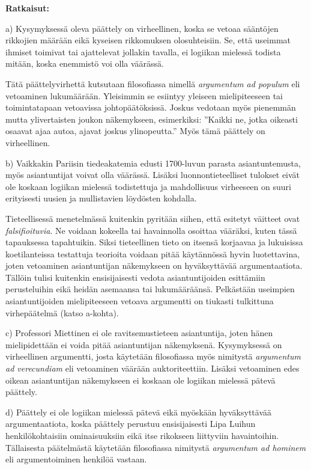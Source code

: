 {\bf Ratkaisut:}

a) Kysymyksessä oleva päättely on virheellinen, koska se vetoaa sääntöjen rikkojien määrään eikä kyseisen rikkomuksen olosuhteisiin. Se, että useimmat ihmiset toimivat tai ajattelevat jollakin tavalla, ei logiikan mielessä todista mitään, koska enemmistö voi olla väärässä.

Tätä päättelyvirhettä kutsutaan filosofiassa nimellä {\em argumentum ad populum} eli vetoaminen lukumäärään.  Yleisimmin se esiintyy yleiseen mielipiteeseen tai toimintatapaan vetoavissa johtopäätöksissä. Joskus vedotaan myös pienemmän mutta ylivertaisten joukon näkemykseen, esimerkiksi: ''Kaikki ne, jotka oikeasti osaavat ajaa autoa, ajavat joskus ylinopeutta.'' Myös tämä päättely on virheellinen.

b) Vaikkakin Pariisin tiedeakatemia edusti 1700-luvun parasta asiantuntemusta, myös asiantuntijat voivat olla väärässä. Lisäksi luonnontieteelliset tulokset eivät ole koskaan logiikan mielessä todistettuja ja mahdollisuus virheeseen on suuri erityisesti uusien ja mullistavien löy\-dös\-ten kohdalla.

Tieteellisessä menetelmässä kuitenkin pyritään siihen, että esitetyt väitteet ovat {\em falsifioituvia}. Ne voidaan kokeella tai havainnolla osoittaa vääräksi, kuten tässä tapauksessa tapahtuikin. Siksi tieteellinen tieto on itsensä korjaavaa ja lukuisissa koetilanteissa testattuja teorioita voidaan pitää käytännössä hyvin luotettavina, joten vetoaminen asiantuntijan näkemykseen on hyväksyttävää argumentaatiota. Tällöin tulisi kuitenkin ensisijaisesti vedota asiantuntijoiden esittämiin perusteluihin eikä heidän asemaansa tai lukumääräänsä. Pelkästään useimpien asiantuntijoiden mielipiteeseen vetoava argumentti on tiukasti tulkittuna virhepäätelmä (katso a-kohta).

c) Professori Miettinen ei ole ravitsemustieteen asiantuntija, joten hänen mielipidettään ei voida pitää asiantuntijan näkemyksenä. Kysymyksessä on virheellinen argumentti, josta käytetään filosofiassa myös nimitystä {\em argumentum ad verecundiam} eli vetoaminen väärään auktoriteettiin. Lisäksi vetoaminen edes oikean asiantuntijan näkemykseen ei koskaan ole logiikan mielessä pätevä päättely.

d) Päättely ei ole logiikan mielessä pätevä eikä myöskään hy\-väk\-syt\-tä\-vää argumentaatiota, koska päättely perustuu ensisijaisesti Lipa Luihun henkilökohtaisiin ominaisuuksiin eikä itse rikokseen liittyviin havaintoihin. Tällaisesta päätelmästä käytetään filosofiassa nimitystä {\em argumentum ad hominem} eli argumentoiminen henkilöä vastaan.

